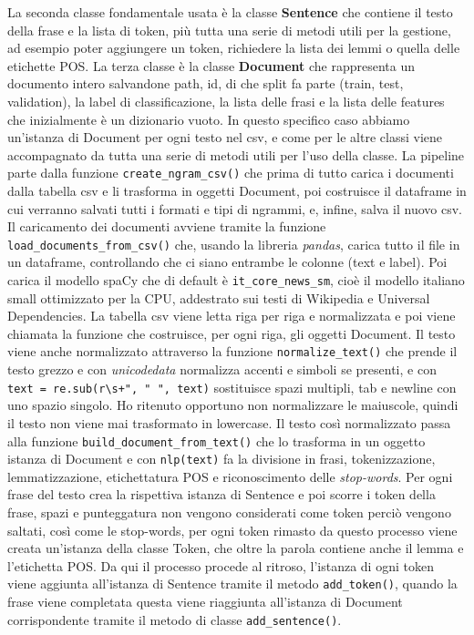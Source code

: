 \documentclass[a4paper,12pt]{report}
\begin{document}
    La seconda classe fondamentale usata è la classe \textbf{Sentence} che contiene il testo della frase e la lista di token, più tutta una serie di metodi utili per la gestione, ad esempio poter aggiungere un token, richiedere la lista dei lemmi o quella delle etichette POS. La terza classe è la classe \textbf{Document} che rappresenta un documento intero salvandone path, id, di che split fa parte (train, test, validation), la label di classificazione, la lista delle frasi e la lista delle features che inizialmente è un dizionario vuoto. In questo specifico caso abbiamo un'istanza di Document per ogni testo nel csv, e come per le altre classi viene accompagnato da tutta una serie di metodi utili per l'uso della classe. 
    La pipeline parte dalla funzione \texttt{create\_ngram\_csv()} che prima di tutto carica i documenti dalla tabella csv e li trasforma in oggetti Document, poi costruisce il dataframe in cui verranno salvati tutti i formati e tipi di ngrammi, e, infine, salva il nuovo csv.
    Il caricamento dei documenti avviene tramite la funzione \texttt{load\_documents\_from\_csv()} che, usando la libreria \textit{pandas}, carica tutto il file in un dataframe, controllando che ci siano entrambe le colonne (text e label). Poi carica il modello spaCy che di default è \texttt{it\_core\_news\_sm}, cioè il modello italiano small ottimizzato per la CPU, addestrato sui testi di Wikipedia e Universal Dependencies. La tabella csv viene letta riga per riga e normalizzata e poi viene chiamata la funzione che costruisce, per ogni riga, gli oggetti Document.  
    Il testo viene anche normalizzato attraverso la funzione \texttt{normalize\_text()} che prende il testo grezzo e con \textit{unicodedata} normalizza accenti e simboli se presenti, e con \texttt{text = re.sub(r\textbackslash s+", " ", text)} sostituisce spazi multipli, tab e newline con uno spazio singolo. Ho ritenuto opportuno non normalizzare le maiuscole, quindi il testo non viene mai trasformato in lowercase. Il testo così normalizzato passa alla funzione \texttt{build\_document\_from\_text()} che lo trasforma in un oggetto istanza di Document e con \texttt{nlp(text)} fa la divisione in frasi, tokenizzazione, lemmatizzazione, etichettatura POS e riconoscimento delle \textit{stop-words}. Per ogni frase del testo crea la rispettiva istanza di Sentence e poi scorre i token della frase, spazi e punteggatura non vengono considerati come token perciò vengono saltati, così come le stop-words, per ogni token rimasto da questo processo viene creata un'istanza della classe Token, che oltre la parola contiene anche il lemma e l'etichetta POS. Da qui il processo procede al ritroso, l'istanza di ogni token viene aggiunta all'istanza di Sentence tramite il metodo \texttt{add\_token()}, quando la frase viene completata questa viene riaggiunta all'istanza di Document corrispondente tramite il metodo di classe \texttt{add\_sentence()}.
\end{document}
